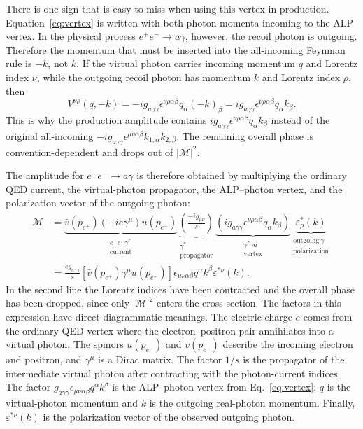 \documentclass[12pt,a4paper]{article}
\newcommand{\gagg}{g_{a\gamma\gamma}}
\begin{document}
There is one sign that is easy to miss when using this vertex in production.
Equation~\eqref{eq:vertex} is written with both photon momenta incoming to the
ALP vertex. In the physical process $e^+e^-\to a\gamma$, however, the recoil
photon is outgoing. Therefore the momentum that must be inserted into the
all-incoming Feynman rule is $-k$, not $k$. If the virtual photon carries
incoming momentum $q$ and Lorentz index $\nu$, while the outgoing recoil photon
has momentum $k$ and Lorentz index $\rho$, then
\begin{equation}
    V^{\nu\rho}(q,-k)
    =
    -i\gagg\epsilon^{\nu\rho\alpha\beta}q_\alpha(-k)_\beta
    =
    i\gagg\epsilon^{\nu\rho\alpha\beta}q_\alpha k_\beta .
    \label{eq:prod_vertex_sign}
\end{equation}
This is why the production amplitude contains
$ig_{a\gamma \gamma}\epsilon^{\nu \rho\alpha \beta}q_{\alpha}k_{\beta}$
instead of the original all-incoming
$-ig_{a\gamma\gamma}\epsilon^{\mu\nu\alpha\beta}k_{1,\alpha}k_{2,\beta}$.
The remaining overall phase is convention-dependent and drops out of
$|\mathcal{M}|^2$.

The amplitude for $e^+e^-\to a\gamma$ is therefore obtained by multiplying the
ordinary QED current, the virtual-photon propagator, the ALP--photon vertex,
and the polarization vector of the outgoing photon:
\begin{align}
    \mathcal{M}
    &=
    \underbrace{\bar{v}(p_{e^+})(-ie\gamma^{\mu})u(p_{e^-})}
        _{\substack{e^+e^-\gamma^\ast\\ \mathrm{current}}}
    \underbrace{\left(\frac{-ig_{\mu \nu}}{s}\right)}
        _{\substack{\gamma^\ast\\ \mathrm{propagator}}}
    \underbrace{\left(ig_{a\gamma \gamma}\epsilon^{\nu \rho\alpha \beta}q_{\alpha}k_{\beta}\right)}
        _{\substack{\gamma^\ast\gamma a\\ \mathrm{vertex}}}
    \underbrace{\varepsilon ^{*}_{\rho}(k)}
        _{\substack{\mathrm{outgoing}\ \gamma\\ \mathrm{polarization}}}
    \nonumber\\
    &=
    \frac{e\gagg}{s}
    \left[
      \bar v(p_{e^+})\gamma^\mu u(p_{e^-})
    \right]
    \epsilon_{\mu\nu\alpha\beta}
    q^\alpha k^\beta
    \varepsilon^{*\nu}(k).
    \label{eq:prod_amp}
\end{align}
In the second line the Lorentz indices have been contracted and the overall
phase has been dropped, since only $|\mathcal{M}|^2$ enters the cross section.
The factors in this expression have direct diagrammatic meanings. The electric
charge $e$ comes from the ordinary QED vertex where the electron--positron pair
annihilates into a virtual photon. The spinors $u(p_{e^-})$ and
$\bar v(p_{e^+})$ describe the incoming electron and positron, and
$\gamma^\mu$ is a Dirac matrix. The factor $1/s$ is the propagator of the
intermediate virtual photon after contracting with the photon-current indices.
The factor $\gagg\epsilon_{\mu\nu\alpha\beta}q^\alpha k^\beta$ is the
ALP--photon vertex from Eq.~\eqref{eq:vertex}; $q$ is the virtual-photon
momentum and $k$ is the outgoing real-photon momentum. Finally,
$\varepsilon^{*\nu}(k)$ is the polarization vector of the observed outgoing
photon.
\end{document}
